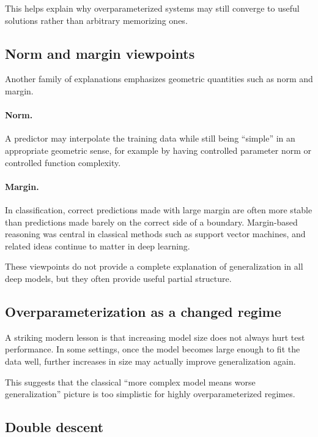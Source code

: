 This helps explain why overparameterized systems may still converge to useful solutions rather than arbitrary memorizing ones.

\subsection*{Norm and margin viewpoints}

Another family of explanations emphasizes geometric quantities such as norm and margin.

\paragraph{Norm.}
A predictor may interpolate the training data while still being ``simple'' in an appropriate geometric sense, for example by having controlled parameter norm or controlled function complexity.

\paragraph{Margin.}
In classification, correct predictions made with large margin are often more stable than predictions made barely on the correct side of a boundary.
Margin-based reasoning was central in classical methods such as support vector machines, and related ideas continue to matter in deep learning.

\medskip

These viewpoints do not provide a complete explanation of generalization in all deep models, but they often provide useful partial structure.

\subsection*{Overparameterization as a changed regime}

A striking modern lesson is that increasing model size does not always hurt test performance.
In some settings, once the model becomes large enough to fit the data well, further increases in size may actually improve generalization again.

\medskip

This suggests that the classical ``more complex model means worse generalization'' picture is too simplistic for highly overparameterized regimes.

\subsection*{Double descent}

